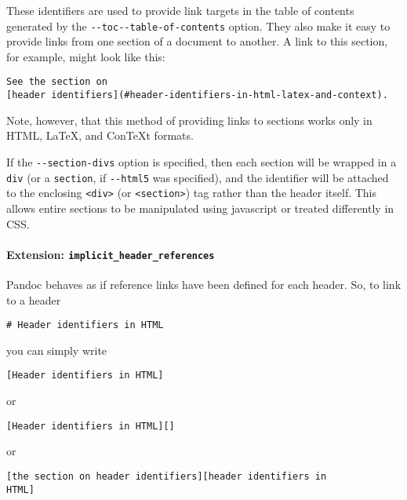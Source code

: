 \documentclass[]{article}
\let\oldparagraph\paragraph
\renewcommand{\paragraph}[1]{\oldparagraph{#1}\mbox{}}
\begin{document}
These identifiers are used to provide link targets in the table of
contents generated by the
\texttt{-\/-toc\textbar{}-\/-table-of-contents} option. They also make
it easy to provide links from one section of a document to another. A
link to this section, for example, might look like this:

\begin{verbatim}
See the section on
[header identifiers](#header-identifiers-in-html-latex-and-context).
\end{verbatim}

Note, however, that this method of providing links to sections works
only in HTML, LaTeX, and ConTeXt formats.

If the \texttt{-\/-section-divs} option is specified, then each section
will be wrapped in a \texttt{div} (or a \texttt{section}, if
\texttt{-\/-html5} was specified), and the identifier will be attached
to the enclosing \texttt{\textless{}div\textgreater{}} (or
\texttt{\textless{}section\textgreater{}}) tag rather than the header
itself. This allows entire sections to be manipulated using javascript
or treated differently in CSS.

\paragraph{\texorpdfstring{Extension:
\texttt{implicit\_header\_references}}{Extension: implicit\_header\_references}}\label{extension-implicit_header_references}

Pandoc behaves as if reference links have been defined for each header.
So, to link to a header

\begin{verbatim}
# Header identifiers in HTML
\end{verbatim}

you can simply write

\begin{verbatim}
[Header identifiers in HTML]
\end{verbatim}

or

\begin{verbatim}
[Header identifiers in HTML][]
\end{verbatim}

or

\begin{verbatim}
[the section on header identifiers][header identifiers in
HTML]
\end{verbatim}
\end{document}
